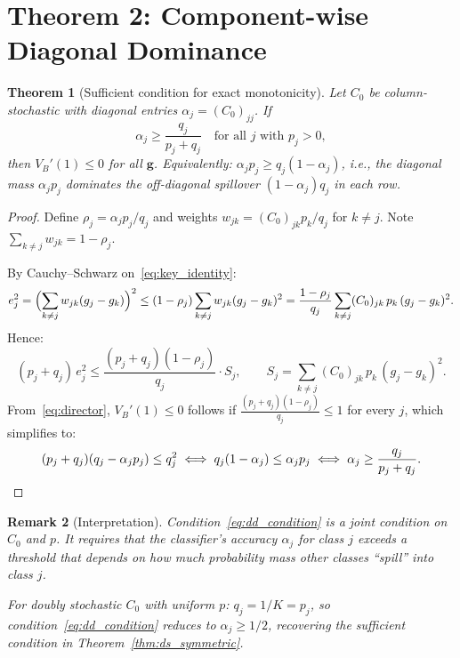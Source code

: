 \documentclass[11pt]{article}
\newtheorem{theorem}{Theorem}
\newtheorem{remark}[theorem]{Remark}
\begin{document}
\section{Theorem 2: Component-wise Diagonal Dominance}

\begin{theorem}[Sufficient condition for exact monotonicity]
\label{thm:dd_sufficient}
Let $C_0$ be column-stochastic with diagonal entries $\alpha_j = (C_0)_{jj}$.
If
\begin{equation}
  \alpha_j \geq \frac{q_j}{p_j + q_j} \quad \text{for all } j \text{ with } p_j > 0,
  \label{eq:dd_condition}
\end{equation}
then $V_B'(1) \leq 0$ for all $\mathbf{g}$.
Equivalently: $\alpha_j p_j \geq q_j(1 - \alpha_j)$, i.e., the diagonal mass $\alpha_j p_j$ dominates
the off-diagonal spillover $(1-\alpha_j)q_j$ in each row.
\end{theorem}

\begin{proof}
Define $\rho_j = \alpha_j p_j / q_j$ and weights $w_{jk} = (C_0)_{jk} p_k / q_j$ for $k \neq j$.
Note $\sum_{k\neq j} w_{jk} = 1 - \rho_j$.

By Cauchy--Schwarz on~\eqref{eq:key_identity}:
\[
  e_j^2 = \Bigl(\sum_{k\neq j} w_{jk}(g_j - g_k)\Bigr)^2
  \leq (1 - \rho_j)\sum_{k\neq j} w_{jk}(g_j-g_k)^2
  = \frac{1-\rho_j}{q_j}\sum_{k\neq j} (C_0)_{jk}\,p_k\,(g_j-g_k)^2.
\]
Hence:
\[
  (p_j + q_j)\,e_j^2 \leq \frac{(p_j+q_j)(1-\rho_j)}{q_j} \cdot S_j,
  \qquad S_j = \sum_{k\neq j}(C_0)_{jk}\,p_k\,(g_j-g_k)^2.
\]
From~\eqref{eq:director}, $V_B'(1) \leq 0$ follows if
$\frac{(p_j+q_j)(1-\rho_j)}{q_j} \leq 1$ for every $j$, which simplifies to:
\[
  (p_j + q_j)(q_j - \alpha_j p_j) \leq q_j^2
  \iff q_j(1-\alpha_j) \leq \alpha_j p_j
  \iff \alpha_j \geq \frac{q_j}{p_j + q_j}. \qedhere
\]
\end{proof}

\begin{remark}[Interpretation]
Condition~\eqref{eq:dd_condition} is a \emph{joint} condition on $C_0$ and $p$.
It requires that the classifier's accuracy $\alpha_j$ for class $j$ exceeds a threshold
that depends on how much probability mass other classes ``spill'' into class $j$.

For doubly stochastic $C_0$ with uniform $p$: $q_j = 1/K = p_j$, so
condition~\eqref{eq:dd_condition} reduces to $\alpha_j \geq 1/2$, recovering
the sufficient condition in Theorem~\ref{thm:ds_symmetric}.
\end{remark}
\end{document}
